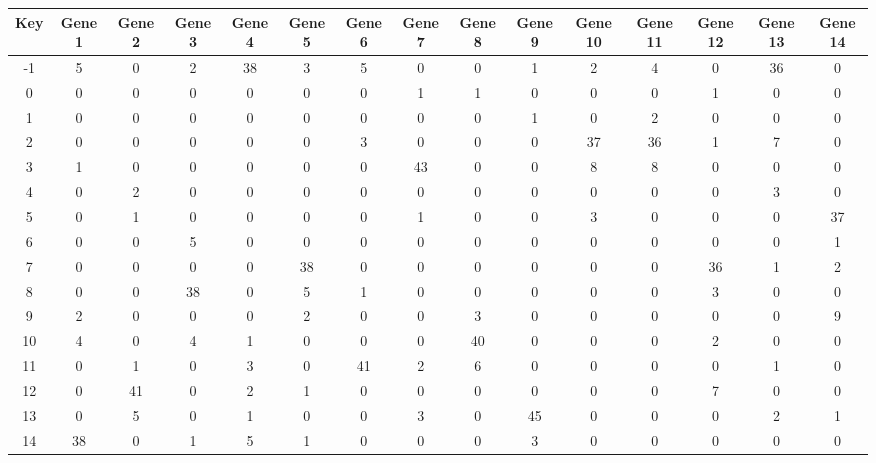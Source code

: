 \begin{tabular}{|c|c|c|c|c|c|c|c|c|c|c|c|c|c|c|}
\hline
Key & Gene 1 & Gene 2 & Gene 3 & Gene 4 & Gene 5 & Gene 6 & Gene 7 & Gene 8 & Gene 9 & Gene 10 & Gene 11 & Gene 12 & Gene 13 & Gene 14 \\
\hline
-1 & 5 & 0 & 2 & 38 & 3 & 5 & 0 & 0 & 1 & 2 & 4 & 0 & 36 & 0 \\
0 & 0 & 0 & 0 & 0 & 0 & 0 & 1 & 1 & 0 & 0 & 0 & 1 & 0 & 0 \\
1 & 0 & 0 & 0 & 0 & 0 & 0 & 0 & 0 & 1 & 0 & 2 & 0 & 0 & 0 \\
2 & 0 & 0 & 0 & 0 & 0 & 3 & 0 & 0 & 0 & 37 & 36 & 1 & 7 & 0 \\
3 & 1 & 0 & 0 & 0 & 0 & 0 & 43 & 0 & 0 & 8 & 8 & 0 & 0 & 0 \\
4 & 0 & 2 & 0 & 0 & 0 & 0 & 0 & 0 & 0 & 0 & 0 & 0 & 3 & 0 \\
5 & 0 & 1 & 0 & 0 & 0 & 0 & 1 & 0 & 0 & 3 & 0 & 0 & 0 & 37 \\
6 & 0 & 0 & 5 & 0 & 0 & 0 & 0 & 0 & 0 & 0 & 0 & 0 & 0 & 1 \\
7 & 0 & 0 & 0 & 0 & 38 & 0 & 0 & 0 & 0 & 0 & 0 & 36 & 1 & 2 \\
8 & 0 & 0 & 38 & 0 & 5 & 1 & 0 & 0 & 0 & 0 & 0 & 3 & 0 & 0 \\
9 & 2 & 0 & 0 & 0 & 2 & 0 & 0 & 3 & 0 & 0 & 0 & 0 & 0 & 9 \\
10 & 4 & 0 & 4 & 1 & 0 & 0 & 0 & 40 & 0 & 0 & 0 & 2 & 0 & 0 \\
11 & 0 & 1 & 0 & 3 & 0 & 41 & 2 & 6 & 0 & 0 & 0 & 0 & 1 & 0 \\
12 & 0 & 41 & 0 & 2 & 1 & 0 & 0 & 0 & 0 & 0 & 0 & 7 & 0 & 0 \\
13 & 0 & 5 & 0 & 1 & 0 & 0 & 3 & 0 & 45 & 0 & 0 & 0 & 2 & 1 \\
14 & 38 & 0 & 1 & 5 & 1 & 0 & 0 & 0 & 3 & 0 & 0 & 0 & 0 & 0 \\
\hline
\end{tabular}